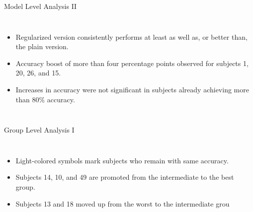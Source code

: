 \documentclass[aspectratio=169]{beamer}
\begin{document}
\begin{frame}{Model Level Analysis II} 
    \begin{columns}
            \begin{itemize}
                \item Regularized version consistently performs at least as well as, or better than, the plain version.
                \item Accuracy boost of more than four percentage points observed for subjects 1, 20, 26, and 15.
                \item Increases in accuracy were not significant in subjects already achieving more than $80\%$ accuracy.
            \end{itemize}
            \centering
            \resizebox{1\linewidth}{!}{}
    \end{columns}     
\end{frame}

\begin{frame}{Group Level Analysis I}
    \begin{columns}
            \centering
            \resizebox{1\linewidth}{!}{}
            \begin{itemize}
                \item Light-colored symbols mark subjects who remain with same accuracy.
                \item Subjects 14, 10, and 49 are promoted from the intermediate to the best group.
                \item Subjects 13 and 18 moved up from the worst to the intermediate grou
            \end{itemize}
    \end{columns}       
\end{frame}
\end{document}
